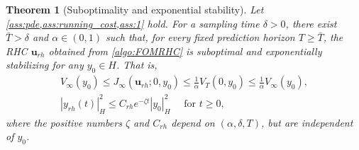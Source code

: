 \documentclass{m2an}
\newcommand{\bu}{\mathbf{u}}
\newcommand{\norm}[2]{\left|#1\right|_{#2}}
\newtheorem{theorem}[thrm]{Theorem}
\begin{document}
\begin{theorem}[Suboptimality and exponential stability]\label{theorem:stabilityRHC}
%
Let \cref{ass:pde,ass:running_cost,ass:1} hold. For a sampling time $\delta>0$, there exist $\bar T > \delta$ and $\alpha \in (0,1)$ such that, for every fixed prediction horizon $T \geq \bar T$, the RHC $\bu_{rh}$ obtained from \cref{algo:FOMRHC} is suboptimal and exponentially stabilizing for any $y_0 \in H$. That is,
\begin{align}
\label{ed27}
    V_{\infty}(y_0) \leq J_{\infty}(\bu_{rh};0,y_0)\leq \tfrac{1}{\alpha}V_{T}(0,y_0) \leq \tfrac{1}{\alpha} V_{\infty}(y_0),\\
    \label{ed28}
    \norm{y_{rh}(t)}{H}^2 \leq  C_{rh}e^{-\zeta t} \norm{y_0}{H}^2 \quad  \text{ for }  t\geq 0,
\end{align}
%
where the positive numbers $\zeta$ and $C_{rh}$ depend on $(\alpha,\delta,T)$, but are independent of $y_0$.
%
\end{theorem}
%
\end{document}
